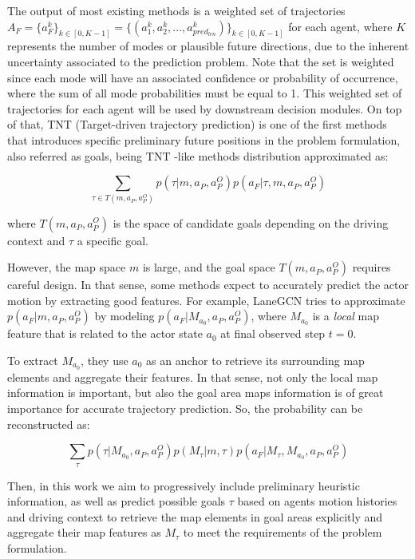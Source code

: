 The output of most existing methods is a weighted set of trajectories $A_F = \{a_{F}^k\}_{k \in [0,K-1]}= \{(a_{1}^k,a_{2}^k,...,a_{pred_{len}}^k)\}_{k \in [0,K-1]}$ for each agent, where $K$ represents the number of modes or plausible future directions, due to the inherent uncertainty associated to the prediction problem. Note that the set is weighted since each mode will have an associated confidence or probability of occurrence, where the sum of all mode probabilities must be equal to 1. This weighted set of trajectories for each agent will be used by downstream decision modules. On top of that, TNT (Target-driven trajectory prediction) \cite{zhao2021tnt} is one of the first methods that introduces specific preliminary future positions in the problem formulation, also referred as goals, being TNT \cite{zhao2021tnt}-like methods distribution approximated as:

\begin{equation}
	\sum_{\tau \in T(m, a_P, a^O_P)}{p(\tau|m, a_P, a^O_P)p(a_F|\tau, m, a_P, a^O_P)}
\end{equation}

where $T(m, a_P, a^O_P)$ is the space of candidate goals depending on the driving context and $\tau$ a specific goal.

However, the map space $m$ is large, and the goal space $T(m, a_P, a^O_P)$ requires careful design. In that sense, some methods expect to accurately predict the actor motion by extracting good features. For example, LaneGCN \cite{liang2020learning} tries to approximate $p(a_F|m, a_P, a^O_P)$ by modeling $p(a_F|M_{a_0}, a_P, a^O_P)$, where $M_{a_0}$ is a \textit{local} map feature that is related to the actor state $a_0$ at final observed step $t=0$.

To extract $M_{a_0}$, they use $a_0$ as an anchor to retrieve its surrounding map elements and aggregate their features. In that sense, not only the local map information is important, but also the goal area maps information is of great importance for accurate trajectory prediction. So, the probability can be reconstructed as:

\begin{equation}
	\sum _{\tau}{p(\tau|M_{a_0}, a_P, a^O_P) p(M_{\tau}|m, \tau)p(a_F|M_{\tau},M_{a_0}, a_P, a^O_P)}
\end{equation}

Then, in this work we aim to progressively include preliminary heuristic information, as well as predict possible goals $\tau$ based on agents motion histories and driving context to retrieve the map elements in goal areas explicitly and aggregate their map features as $M_{\tau}$ to meet the requirements of the problem formulation. 

